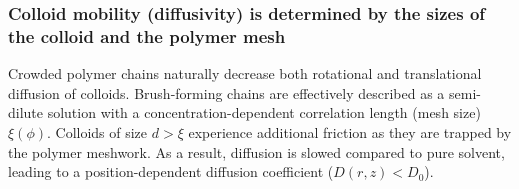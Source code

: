 \documentclass[12pt, a4paper]{article}
\begin{document}
\subsubsection{Colloid mobility (diffusivity) is determined by the sizes of the colloid and the polymer mesh}

Crowded polymer chains naturally decrease both rotational \cite{Fu2017} and translational \cite{Stewart1998} diffusion of colloids.
Brush-forming chains are effectively described as a semi-dilute solution with a concentration-dependent correlation length (mesh size) $\xi(\phi)$.
Colloids of size $d > \xi$ experience additional friction as they are trapped by the polymer meshwork.
As a result, diffusion is slowed compared to pure solvent, leading to a position-dependent diffusion coefficient ($D(r,z) < D_0$).





\end{document}
